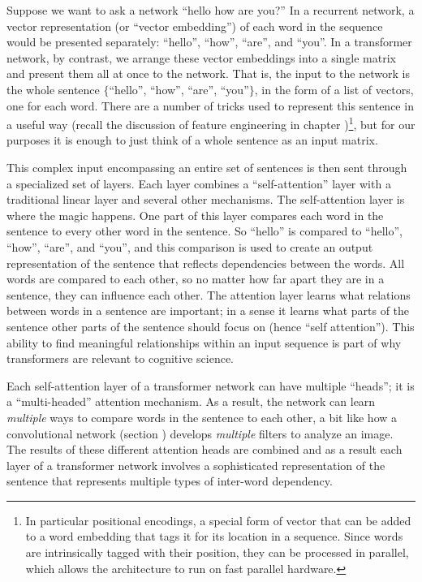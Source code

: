 Suppose we want to ask a network ``hello how are you?'' In a recurrent network,  a vector representation (or ``vector embedding'') of each word in the sequence would be presented separately: ``hello'', ``how'', ``are'', and ``you''. In a transformer network, by contrast, we arrange these vector embeddings into a single matrix and present them all at once to the network. That is, the input to the network is the whole sentence $\{$``hello'', ``how'', ``are'', ``you''$\}$, in the form of a list of vectors, one for each word. There are a number of tricks used to represent this sentence in a useful way (recall the discussion of feature engineering in chapter )\footnote{In particular positional encodings, a special form of vector that can be added to a word embedding that tags it for its location in a sequence. Since words are intrinsically tagged with their position, they can be processed in parallel, which allows the architecture to run on fast parallel hardware.}, but for our purposes it is enough to just think of a whole sentence as an input matrix.

This complex input encompassing an entire set of sentences is then sent through a specialized set of layers. Each layer combines  a ``self-attention'' layer with a traditional linear layer and several other mechanisms.  The self-attention layer is where the magic happens.  One part of this layer compares each word in the sentence to every other word in the sentence. So ``hello'' is compared to ``hello'', ``how'', ``are'', and ``you'', and this comparison is used to create an output representation of the sentence that reflects dependencies between the words. All words are compared to each other, so no matter how far apart they are in a sentence, they can influence each other. The attention layer learns what relations between words in a sentence are important; in a sense it learns what parts of the sentence other parts of the sentence should focus on (hence ``self attention'').  This ability to find meaningful relationships within an input sequence is part of why transformers are relevant to cognitive science.

Each self-attention layer of a transformer network can have multiple ``heads'';  it is a ``multi-headed'' attention mechanism.  As a result, the network can learn \emph{multiple} ways to compare words in the sentence to each other, a bit like how a convolutional network (section ) develops \emph{multiple} filters to analyze an image.  The results of these different attention heads are combined and as a result each layer of a transformer network involves a sophisticated representation of the sentence that represents multiple types of inter-word dependency.

